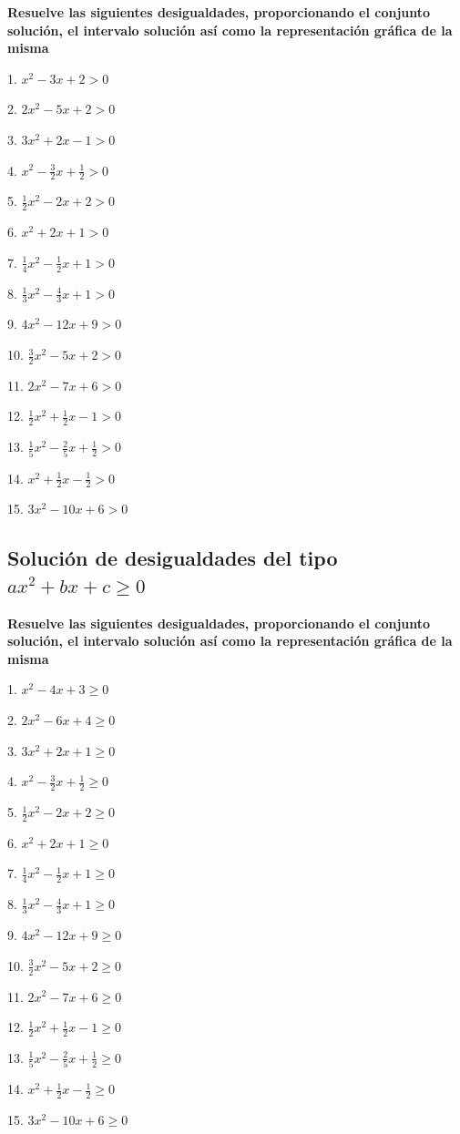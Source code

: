 \documentclass[]{book}
\begin{document}
\textbf{Resuelve las siguientes desigualdades, proporcionando el
conjunto solución, el intervalo solución así como la representación
gráfica de la misma}

\begin{multicols}{3}
1. $x^2-3x+2>0$

2. $2x^2-5x+2>0$

3. $3x^2+2x-1>0$

4. $x^2-\frac{3}{2}x+\frac{1}{2}>0$

5. $\frac{1}{2}x^2-2x+2>0$

6. $x^2+2x+1>0$

7. $\frac{1}{4}x^2-\frac{1}{2}x+1>0$

8. $\frac{1}{3}x^2-\frac{4}{3}x+1>0$

9. $4x^2-12x+9>0$

10. $\frac{3}{2}x^2-5x+2>0$

11. $2x^2-7x+6>0$

12. $\frac{1}{2}x^2+\frac{1}{2}x-1>0$

13. $\frac{1}{5}x^2-\frac{2}{5}x+\frac{1}{2}>0$

14. $x^2+\frac{1}{2}x-\frac{1}{2}>0$

15. $3x^2-10x+6>0$
\end{multicols}

\subsection{\texorpdfstring{Solución de desigualdades del tipo
\(ax^2+bx+c\geq 0\)}{Solución de desigualdades del tipo ax\^{}2+bx+c\textbackslash{}geq 0}}\label{soluciuxf3n-de-desigualdades-del-tipo-ax2bxcgeq-0}

\textbf{Resuelve las siguientes desigualdades, proporcionando el
conjunto solución, el intervalo solución así como la representación
gráfica de la misma}

\begin{multicols}{3}
1. $x^2-4x+3\geq 0$

2. $2x^2-6x+4\geq 0$

3. $3x^2+2x+1\geq 0$

4. $x^2-\frac{3}{2}x+\frac{1}{2}\geq 0$

5. $\frac{1}{2}x^2-2x+2\geq 0$

6. $x^2+2x+1\geq 0$

7. $\frac{1}{4}x^2-\frac{1}{2}x+1\geq 0$

8. $\frac{1}{3}x^2-\frac{4}{3}x+1\geq 0$

9. $4x^2-12x+9\geq 0$

10. $\frac{3}{2}x^2-5x+2\geq 0$

11. $2x^2-7x+6\geq 0$

12. $\frac{1}{2}x^2+\frac{1}{2}x-1\geq 0$

13. $\frac{1}{5}x^2-\frac{2}{5}x+\frac{1}{2}\geq 0$

14. $x^2+\frac{1}{2}x-\frac{1}{2}\geq 0$

15. $3x^2-10x+6\geq 0$
\end{multicols}
\end{document}
